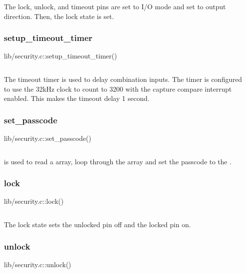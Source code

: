 \documentclass{article}
\begin{document}
The lock, unlock, and timeout pins are set to I/O mode and set to output
direction. Then, the lock state is set.

\subsubsection{setup\_timeout\_timer}

\begin{listing}[H]
  \caption{lib/security.c::setup\_timeout\_timer()}
  \inputminted[linenos,firstline=38, lastline=47]{C}{../msp430g2553/lib/security.c}
\end{listing}

The timeout timer is used to delay combination inputs. The timer is configured
to use the 32kHz clock to count to 3200 with the capture compare interrupt
enabled. This makes the timeout delay 1 second.

\subsubsection{set\_passcode}

\begin{listing}[H]
  \caption{lib/security.c::set\_passcode()}
  \inputminted[linenos,firstline=48, lastline=57]{C}{../msp430g2553/lib/security.c}
\end{listing}

 is used to read a  array, loop through the
array and set the passcode to the .

\subsubsection{lock}

\begin{listing}[H]
  \caption{lib/security.c::lock()}
  \inputminted[linenos,firstline=58, lastline=66]{C}{../msp430g2553/lib/security.c}
\end{listing}

The lock state sets the unlocked pin off and the locked pin on.

\subsubsection{unlock}

\begin{listing}[H]
  \caption{lib/security.c::unlock()}
  \inputminted[linenos,firstline=67, lastline=75]{C}{../msp430g2553/lib/security.c}
\end{listing}
\end{document}

